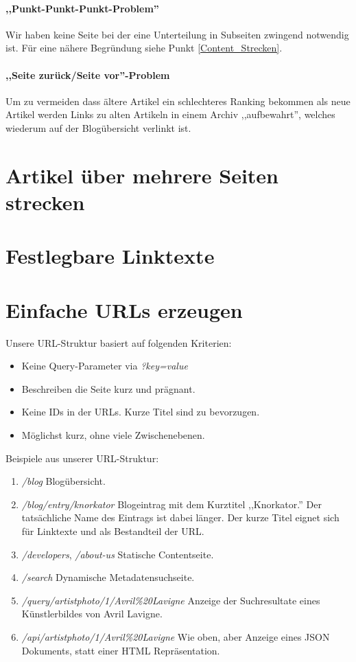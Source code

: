 \paragraph{,,Punkt-Punkt-Punkt-Problem''}
Wir haben keine Seite bei der eine Unterteilung in Subseiten zwingend notwendig
ist. Für eine nähere Begründung siehe Punkt \ref{Content_Strecken}.

\paragraph{,,Seite zurück/Seite vor''-Problem}
Um zu vermeiden dass ältere Artikel ein schlechteres Ranking bekommen als neue
Artikel werden Links zu alten Artikeln in einem Archiv ,,aufbewahrt'', welches
wiederum auf der Blogübersicht verlinkt ist.


\label{Content_Strecken}
\section{Artikel über mehrere Seiten strecken}



\section{Festlegbare Linktexte}

\section{Einfache URLs erzeugen}
Unsere URL-Struktur basiert auf folgenden Kriterien:
\begin{itemize}
\item Keine Query-Parameter via \emph{?key=value}
\item Beschreiben die Seite kurz und prägnant.
\item Keine IDs in der URLs. Kurze Titel sind zu bevorzugen.
\item Möglichst kurz, ohne viele Zwischenebenen.
\end{itemize}


Beispiele aus unserer URL-Struktur:
\begin{enumerate}
    \item \emph{/blog} Blogübersicht.
    \item \emph{/blog/entry/knorkator} Blogeintrag mit dem Kurztitel ,,Knorkator.''
          Der tatsächliche Name des Eintrags ist dabei länger. Der kurze Titel
          eignet sich für Linktexte und als Bestandteil der URL.
    \item \emph{/developers}, \emph{/about-us} Statische Contentseite.
    \item \emph{/search} Dynamische Metadatensuchseite.
    \item \emph{/query/artistphoto/1/Avril\%20Lavigne} Anzeige der Suchresultate
    eines Künstlerbildes von Avril Lavigne.
    \item \emph{/api/artistphoto/1/Avril\%20Lavigne} Wie oben, aber Anzeige
    eines JSON Dokuments, statt einer HTML Repräsentation.
\end{enumerate}

